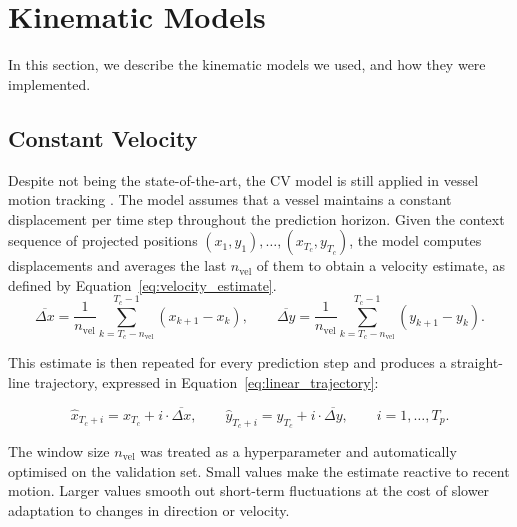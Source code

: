                   
    
\section{Kinematic Models}
\label{sec:kinematicimplementation}
In this section, we describe the kinematic models we used, and how they were implemented.
   \subsection{Constant Velocity}
    \label{sec:method-cv}

    Despite not being the state-of-the-art, the \acf{CV} model is still applied in vessel motion tracking  \parencite{8693856CV}. %
    The  model assumes that a vessel maintains a constant displacement
    per time step throughout the prediction horizon. Given the context sequence
    of projected positions $(x_1, y_1), \ldots, (x_{T_c}, y_{T_c})$, the model
    computes displacements and averages the last
    $n_\text{vel}$ of them to obtain a velocity estimate, as defined by Equation~\ref{eq:velocity_estimate}.    
    \begin{equation}
        \overline{\Delta x} = \frac{1}{n_\text{vel}} \sum_{k=T_c - n_\text{vel}}^{T_c - 1} (x_{k+1} - x_k),
        \qquad
        \overline{\Delta y} = \frac{1}{n_\text{vel}} \sum_{k=T_c - n_\text{vel}}^{T_c - 1} (y_{k+1} - y_k).
        \label{eq:velocity_estimate}
    \end{equation}
    
    This estimate is then repeated for every prediction step and produces a straight-line trajectory, expressed in Equation~\ref{eq:linear_trajectory}:
    
    \begin{equation}
        \hat{x}_{T_c + i} = x_{T_c} + i \cdot \overline{\Delta x},
        \qquad
        \hat{y}_{T_c + i} = y_{T_c} + i \cdot \overline{\Delta y},
        \qquad i = 1, \ldots, T_p.
        \label{eq:linear_trajectory}
    \end{equation}
    
    The window size $n_\text{vel}$ was treated as a hyperparameter and
    automatically optimised on the validation set.
    Small values make the estimate reactive to recent motion. 
    Larger values smooth out short-term fluctuations at the cost of slower adaptation to changes in direction or velocity.
    



